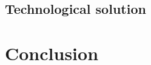 \documentclass[10pt,oneside,english,a4paper]{article}
\begin{document}
\subsection{Technological solution}

\section{Conclusion} \label{zaver} %




\end{document}
